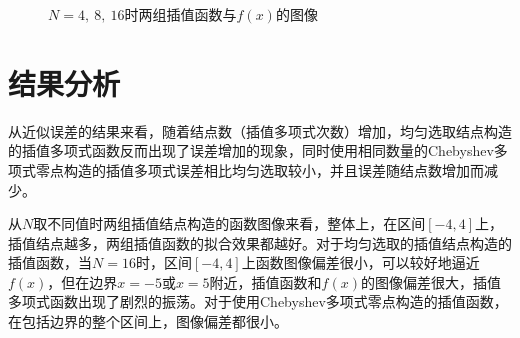 \documentclass[11pt]{article}
\begin{document}
\begin{figure}[H]
    \quad
    \caption{$N = 4,\ 8,\ 16$时两组插值函数与$f(x)$的图像}
    \label{curves}
\end{figure}
\section{结果分析}
从近似误差的结果来看，随着结点数（插值多项式次数）增加，均匀选取结点构造的插值多项式函数反而出现了误差增加的现象，同时使用相同数量的Chebyshev多项式零点构造的插值多项式误差相比均匀选取较小，并且误差随结点数增加而减少。

从$N$取不同值时两组插值结点构造的函数图像来看，整体上，在区间$[-4, 4]$上，插值结点越多，两组插值函数的拟合效果都越好。对于均匀选取的插值结点构造的插值函数，当$N = 16$时，区间$[-4, 4]$上函数图像偏差很小，可以较好地逼近$f(x)$，但在边界$x = -5$或$x = 5$附近，插值函数和$f(x)$的图像偏差很大，插值多项式函数出现了剧烈的振荡。对于使用Chebyshev多项式零点构造的插值函数，在包括边界的整个区间上，图像偏差都很小。
\end{document}
